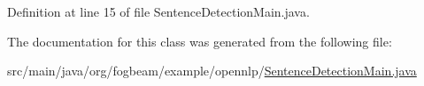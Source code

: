 Definition at line 15 of file Sentence\+Detection\+Main.\+java.



The documentation for this class was generated from the following file\+:\begin{DoxyCompactItemize}
\item 
src/main/java/org/fogbeam/example/opennlp/\hyperlink{_sentence_detection_main_8java}{Sentence\+Detection\+Main.\+java}\end{DoxyCompactItemize}
